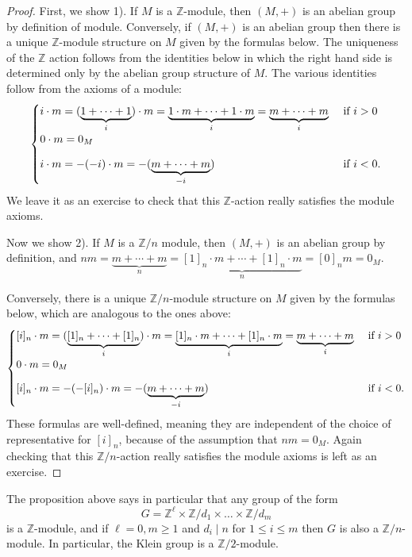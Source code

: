 \documentclass[12pt]{report}
\numberwithin{equation}{section}
\numberwithin{theorem}{chapter}
\theoremstyle{definition}
\newtheorem*{basic properties}{Basic Properties}
\newtheorem*{Important Remark}{Important Remark}
\begin{document}
\begin{proof}
First, we show 1). If $M$ is a $\mathbb{Z}$-module, then $(M,+)$ is an abelian group by definition of module. Conversely, if $(M,+)$ is an abelian group then there is a unique $\mathbb{Z}$-module structure on $M$ given by the formulas below. The uniqueness of the $\mathbb{Z}$ action follows from the identities below in which the right hand side is determined only by the abelian group structure of $M$. The various identities follow from the axioms of a module:
$$
\begin{cases}
i \cdot m = (\underbrace{1 + \cdots + 1}_i) \cdot m = \underbrace{1   \cdot m + \cdots +1 \cdot m}_i
= \underbrace{ m + \cdots + m}_i & \text{ if } i>0\\
0 \cdot m = 0_M & \vspace{0.8em} \\
i \cdot m = - (-i) \cdot m = - (\underbrace{m + \cdots + m}_{-i}) &  \text{ if } i<0.
\end{cases}
$$
We leave it as an exercise to check that this $\mathbb{Z}$-action really satisfies the module axioms.

Now we show 2). If $M$ is a $\mathbb{Z}/n$ module, then $(M,+)$ is an abelian group by definition, and $nm= \underbrace{ m + \cdots + m}_n=\underbrace{[1]_n   \cdot m + \cdots +[1]_n \cdot m}_n=[0]_nm=0_M$. 

Conversely, there is a unique $\mathbb{Z}/n$-module structure on $M$ given by the formulas below, which are analogous to the ones above:
$$
\begin{cases}
[i]_n \cdot m = (\underbrace{[1]_n+ \cdots + [1]_n}_i) \cdot m = \underbrace{[1]_n   \cdot m + \cdots +[1]_n \cdot m}_i= \underbrace{ m + \cdots + m}_i & \text{ if } i>0\\
0 \cdot m = 0_M & \vspace{0.8em}\\
[i]_n \cdot m = - (-[i]_n) \cdot m = - (\underbrace{m + \cdots + m}_{-i}) &  \text{ if } i<0.
\end{cases}
$$
These formulas are well-defined, meaning they are independent of the choice of representative for $[i]_n$, because of the assumption that $nm=0_M$. Again checking that this $\mathbb{Z}/n$-action really satisfies the module axioms is left as an exercise.
\end{proof}

The proposition above says in particular that any group of the form 
$$G=\mathbb{Z}^\ell\times \mathbb{Z}/d_1\times \dots\times \mathbb{Z}/d_m$$
is a $\mathbb{Z}$-module, and if $\ell=0, m \geqslant 1$ and $d_i \mid n$ for $1 \leqslant i \leqslant m$ then $G$ is also a $\mathbb{Z}/n$-module. In particular, the Klein group is a $\mathbb{Z}/2$-module. 
\end{document}
